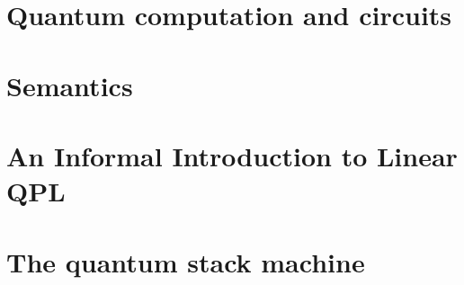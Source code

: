 




\chapter{Quantum computation and circuits}\label{chap:quantumcompandcircuits}




%
\chapter{Semantics}\label{chap:semantics}







\chapter{An Informal Introduction to Linear QPL}\label{chap:informalintroductionLinearQuantumProgrammingLanguage}




\chapter{The quantum stack machine}\label{chap:quantumStackMachine}




%




\begin{singlespace}


\end{singlespace}
\appendix
